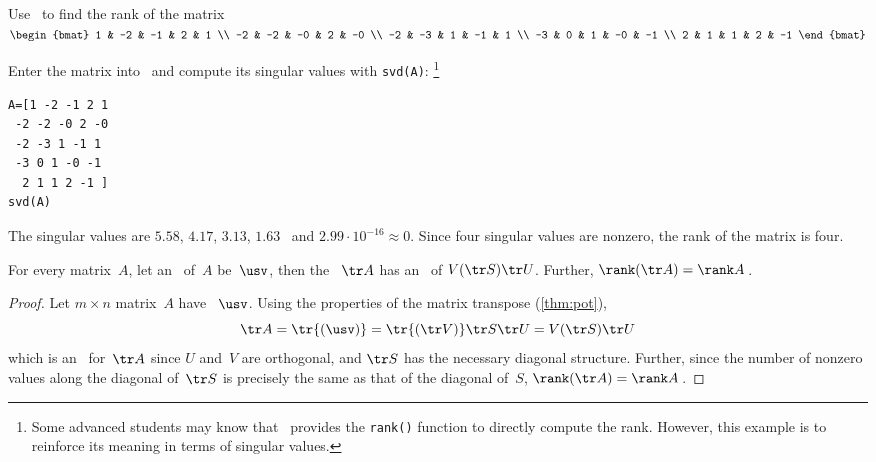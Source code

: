 \begin{example} 
Use \script\ to find the rank of the matrix
\(\begin{bmat}    1 & -2 & -1 & 2 & 1
\\ -2 & -2 & -0 & 2 & -0
\\ -2 & -3 & 1 & -1 & 1
\\ -3 & 0 & 1 & -0 & -1
\\ 2 & 1 & 1 & 2 & -1
 \end{bmat}\)
\begin{solution} 
Enter the matrix into \script\ and compute its singular values with \verb|svd(A)|:%
\footnote{Some advanced students may know that \script\ provides the \texttt{rank()} function to directly compute the rank.  However, this example is to reinforce its meaning in terms of singular values.}
\setbox\ajrqrbox\hbox{}%
\marginajrbox%
\begin{verbatim}
A=[1 -2 -1 2 1
 -2 -2 -0 2 -0
 -2 -3 1 -1 1
 -3 0 1 -0 -1
  2 1 1 2 -1 ]
svd(A)
\end{verbatim}
The singular values are \(5.58\), \(4.17\), \(3.13\), \(1.63\) \twodp\ and \(2.99\cdot10^{-16}\approx0\).
Since four singular values are nonzero, the rank of the matrix is four.
\end{solution}
\end{example}



\begin{theorem} \label{thm:ranktr} 
For every matrix~\(A\), let an \svd\ of~\(A\) be~\(\usv\), then the ~\(\tr A\) has an \svd\ of \(V(\tr S)\tr U\). 
Further, \(\rank(\tr A)=\rank A\)\,.
\end{theorem}
\begin{proof} 
Let \(m\times n\) matrix~\(A\) have \svd~\(\usv\).  
Using the properties of the matrix transpose (\cref{thm:pot}),
\begin{equation*}
\tr A=\tr{(\usv)}
=\tr{(\tr V)}\tr S\tr U
=V(\tr S)\tr U
\end{equation*}
which is an \svd\ for~\(\tr A\) since \(U\) and~\(V\) are orthogonal, and \(\tr S\) has the necessary diagonal structure. 
Further, since the number of nonzero values along the diagonal of~\(\tr S\) is precisely the same as that of the diagonal of~\(S\), \(\rank(\tr A)=\rank A\)\,.
\end{proof}



